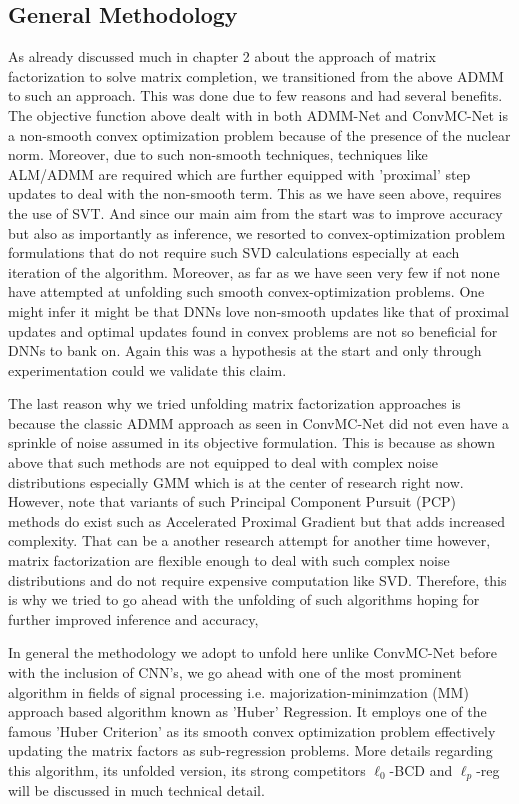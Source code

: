 \subsection{General Methodology}
As already discussed much in chapter 2 about the approach of matrix factorization to solve matrix completion, we transitioned from the above ADMM to such an approach. This was done due to few reasons and had several benefits. The objective function above dealt with in both ADMM-Net and ConvMC-Net is a non-smooth convex optimization problem because of the presence of the nuclear norm. Moreover, due to such non-smooth techniques, techniques like ALM/ADMM are required which are further equipped with 'proximal' step updates to deal with the non-smooth term. This as we have seen above, requires the use of SVT. And since our main aim from the start was to improve accuracy but also as importantly as inference, we resorted to convex-optimization problem formulations that do not require such SVD calculations especially at each iteration of the algorithm. Moreover, as far as we have seen very few if not none have attempted at unfolding such smooth convex-optimization problems. One might infer it might be that DNNs love non-smooth updates like that of proximal updates and optimal updates found in convex problems are not so beneficial for DNNs to bank on. Again this was a hypothesis at the start and only through experimentation could we validate this claim. 

The last reason why we tried unfolding matrix factorization approaches is because the classic ADMM approach as seen in ConvMC-Net did not even have a sprinkle of noise assumed in its objective formulation. This is because as shown above that such methods are not equipped to deal with complex noise distributions especially GMM which is at the center of research right now. However, note that variants of such Principal Component Pursuit (PCP) methods do exist such as Accelerated Proximal Gradient \cite{apg} but that adds increased complexity. That can be a another research attempt for another time however, matrix factorization are flexible enough to deal with such complex noise distributions and do not require expensive computation like SVD. Therefore, this is why we tried to go ahead with the unfolding of such algorithms hoping for further improved inference and accuracy,

In general the methodology we adopt to unfold here unlike ConvMC-Net before with the inclusion of CNN's, we go ahead with one of the most prominent algorithm in fields of signal processing i.e. majorization-minimzation (MM) approach \cite{lange_mm_algorithm} based algorithm known as 'Huber' Regression. It employs one of the famous 'Huber Criterion' \cite{huber_criterion} as its smooth convex optimization problem effectively updating the matrix factors as sub-regression problems. More details regarding this algorithm, its unfolded version, its strong competitors \(\ell_0\)-BCD and \(\ell_p\)-reg will be discussed in much technical detail.


